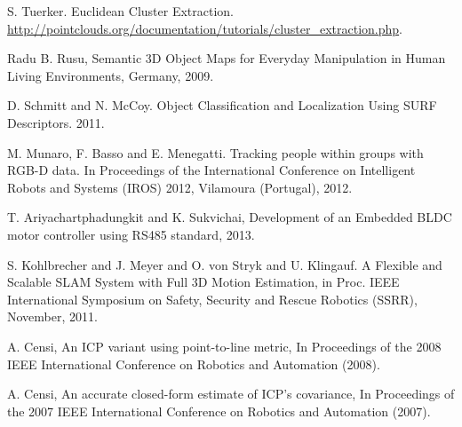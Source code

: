 \documentclass{llncs}
\begin{document}
\begin{thebibliography}{4}

 S. Tuerker. Euclidean Cluster Extraction.\\
\url{http://pointclouds.org/documentation/tutorials/cluster_extraction.php}.

 Radu B. Rusu, 
Semantic 3D Object Maps for Everyday Manipulation in Human Living Environments, Germany, 2009.

 D. Schmitt and N. McCoy. Object Classification and Localization Using SURF Descriptors. 2011.

 M. Munaro, F. Basso and E. Menegatti. Tracking people within groups with RGB-D data. In Proceedings of the International Conference on Intelligent Robots and Systems (IROS) 2012, Vilamoura (Portugal), 2012.

 T. Ariyachartphadungkit and K. Sukvichai, Development of an Embedded BLDC motor controller using RS485 standard, 2013.

 S. Kohlbrecher and J. Meyer and O. von Stryk and U. Klingauf. A Flexible and Scalable SLAM System with Full 3D Motion Estimation, in Proc. IEEE International Symposium on Safety, Security and Rescue Robotics (SSRR), November, 2011.

 A. Censi, An ICP variant using point-to-line metric, In Proceedings of the 2008 IEEE International Conference on Robotics and Automation (2008).

 A. Censi, An accurate closed-form estimate of ICP's covariance, In Proceedings of the 2007 IEEE International Conference on Robotics and Automation (2007).

\end{thebibliography}
\end{document}
